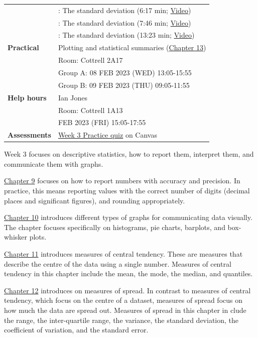 \documentclass[
]{scrbook}
\begin{document}
\begin{longtable}[]{@{}
  >{\raggedright\arraybackslash}p{}
  >{\raggedright\arraybackslash}p{}@{}}
& 3.9: The standard deviation (6:17 min; \href{https://stirling.cloud.panopto.eu/Panopto/Pages/Viewer.aspx?id=db70798b-16fa-4164-839b-af8200d91919}{Video}) \\
& 3.10: The standard deviation (7:46 min; \href{https://stirling.cloud.panopto.eu/Panopto/Pages/Viewer.aspx?id=9aec6aa5-9e3a-40f6-92f4-af8200d91979}{Video}) \\
& 3.11: The standard deviation (13:23 min; \href{https://stirling.cloud.panopto.eu/Panopto/Pages/Viewer.aspx?id=9c7a11df-7182-4f69-b986-af8200d91994}{Video}) \\
\textbf{Practical} & Plotting and statistical summaries (\protect\hyperlink{Chapter_13}{Chapter 13}) \\
& Room: Cottrell 2A17 \\
& Group A: 08 FEB 2023 (WED) 13:05-15:55 \\
& Group B: 09 FEB 2023 (THU) 09:05-11:55 \\
\textbf{Help hours} & Ian Jones \\
& Room: Cottrell 1A13 \\
& 10 FEB 2023 (FRI) 15:05-17:55 \\
\textbf{Assessments} & \href{https://canvas.stir.ac.uk/courses/13075/quizzes/29674}{Week 3 Practice quiz} on Canvas \\
\bottomrule
\end{longtable}

Week 3 focuses on descriptive statistics, how to report them, interpret them, and communicate them with graphs.

\protect\hyperlink{Chapter_9}{Chapter 9} focuses on how to report numbers with accuracy and precision.
In practice, this means reporting values with the correct number of digits (decimal places and significant figures), and rounding appropriately.

\protect\hyperlink{Chapter_10}{Chapter 10} introduces different types of graphs for communicating data visually.
The chapter focuses specifically on histograms, pie charts, barplots, and box-whisker plots.

\protect\hyperlink{Chapter_11}{Chapter 11} introduces measures of central tendency.
These are measures that describe the centre of the data using a single number.
Measures of central tendency in this chapter include the mean, the mode, the median, and quantiles.

\protect\hyperlink{Chapter_12}{Chapter 12} introduces on measures of spread.
In contrast to measures of central tendency, which focus on the centre of a dataset, measures of spread focus on how much the data are spread out.
Measures of spread in this chapter in clude the range, the inter-quartile range, the variance, the standard deviation, the coefficient of variation, and the standard error.
\end{document}
